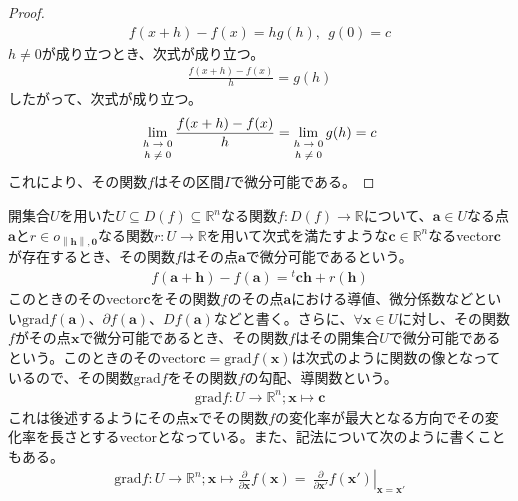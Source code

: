 \documentclass[dvipdfmx]{jsarticle}
\begin{document}
\begin{proof}
\begin{align*}
f(x + h) - f(x) = hg(h),\ \ g(0) = c
\end{align*}
$h \neq 0$が成り立つとき、次式が成り立つ。
\begin{align*}
\frac{f(x + h) - f(x)}{h} = g(h)
\end{align*}
したがって、次式が成り立つ。
\begin{align*}
\lim_{\scriptsize \begin{matrix}
h \rightarrow 0 \\
h \neq 0 \\
\end{matrix}}\frac{f(x + h) - f(x)}{h} = \lim_{\scriptsize \begin{matrix}
h \rightarrow 0 \\
h \neq 0 \\
\end{matrix}}{g(h)} = c
\end{align*}
これにより、その関数$f$はその区間$I$で微分可能である。
\end{proof}
\begin{dfn}
開集合$U$を用いた$U \subseteq D(f) \subseteq \mathbb{R}^{n}$なる関数$f:D(f) \rightarrow \mathbb{R}$について、$\mathbf{a} \in U$なる点$\mathbf{a}$と$r \in o_{\left\| \mathbf{h} \right\|,\mathbf{0}}$なる関数$r:U \rightarrow \mathbb{R}$を用いて次式を満たすような$\mathbf{c} \in \mathbb{R}^{n}$なるvector$\mathbf{c}$が存在するとき、その関数$f$はその点$\mathbf{a}$で微分可能であるという。
\begin{align*}
f\left( \mathbf{a} + \mathbf{h} \right) - f\left( \mathbf{a} \right) ={}^{t}\mathbf{ch} + r\left( \mathbf{h} \right)
\end{align*}
このときのそのvector$\mathbf{c}$をその関数$f$のその点$\mathbf{a}$における導値、微分係数などといい$\mathrm{grad}f\left( \mathbf{a} \right)$、$\partial f\left( \mathbf{a} \right)$、$Df\left( \mathbf{a} \right)$などと書く。さらに、$\forall\mathbf{x} \in U$に対し、その関数$f$がその点$\mathbf{x}$で微分可能であるとき、その関数$f$はその開集合$U$で微分可能であるという。このときのそのvector$\mathbf{c} = \mathrm{grad}f\left( \mathbf{x} \right)$は次式のように関数の像となっているので、その関数$\mathrm{grad}f$をその関数$f$の勾配、導関数という。
\begin{align*}
\mathrm{grad}f:U \rightarrow \mathbb{R}^n;\mathbf{x} \mapsto \mathbf{c}
\end{align*}
これは後述するようにその点$\mathbf{x}$でその関数$f$の変化率が最大となる方向でその変化率を長さとするvectorとなっている。また、記法について次のように書くこともある。
\begin{align*}
\mathrm{grad}f:U \rightarrow \mathbb{R}^n;\mathbf{x} \mapsto \frac{\partial}{\partial\mathbf{x}}f\left( \mathbf{x} \right) = \left. \ \frac{\partial}{\partial\mathbf{x}'}f\left( \mathbf{x}' \right) \right|_{\mathbf{x} = \mathbf{x}'}
\end{align*}
\end{dfn}
\end{document}
